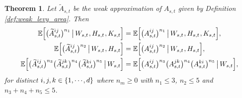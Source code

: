 \documentclass[sn-mathphys-num]{sn-jnl}%
\newtheorem{theorem}{Theorem}%
\newcommand{\E}{\mathbb{E}}
\newcommand{\m}{\hspace{0.25mm}}
\begin{document}
\begin{theorem}\label{thm:match_moments}
Let $\widetilde{A}_{s,t}$ be the weak approximation of $A_{s,t}$ given by Definition \ref{def:weak_levy_area}. Then
\begin{align}
\E\Big[\big(\widetilde{A}_{s,t}^{ij}\big)^{n_1}\,\big|\, W_{s,t}\m, H_{s,t}\m, K_{s,t}\Big] & = \E\Big[\big(A_{s,t}^{ij}\big)^{n_1}\,\big|\, W_{s,t}\m, H_{s,t}\m, K_{s,t}\Big],\label{eq:match_k_moments}\\
\E\Big[\big(\widetilde{A}_{s,t}^{ij}\big)^{n_2}\,\big|\, W_{s,t}\m, H_{s,t}\Big] & = \E\Big[\big(A_{s,t}^{ij}\big)^{n_2}\,\big|\, W_{s,t}\m, H_{s,t}\Big],\label{eq:match_h_moments}\\
\E\Big[\big(\widetilde{A}_{s,t}^{ij}\big)^{n_3}\big(\widetilde{A}_{s,t}^{jk}\big)^{n_4}\big(\widetilde{A}_{s,t}^{ki}\big)^{n_5}\,\big|\, W_{s,t}\Big] & = \E\Big[\big(A_{s,t}^{ij}\big)^{n_3}\big(A_{s,t}^{jk}\big)^{n_4}\big(A_{s,t}^{ki}\big)^{n_5}\,\big|\, W_{s,t}\Big],\label{eq:match_w_moments}
\end{align}
for distinct $i,j,k\in\{1,\cdots\hspace{-0.25mm},d\}$ where $n_m \geq 0$ with $n_1 \leq 3$, $n_2\leq 5$ and $n_3 + n_4 + n_5 \leq 5$.
\end{theorem}
\end{document}
